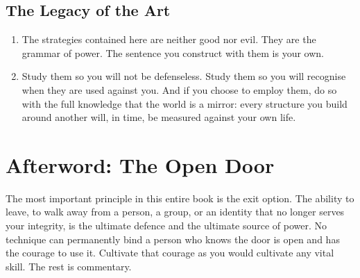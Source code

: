 \documentclass[12pt,a4paper,oneside]{book}
\begin{document}
\section{The Legacy of the Art}
\begin{enumerate}[leftmargin=*, label=\arabic*.]
\item The strategies contained here are neither good nor evil. They are the grammar of power. The sentence you construct with them is your own.
\item Study them so you will not be defenseless. Study them so you will recognise when they are used against you. And if you choose to employ them, do so with the full knowledge that the world is a mirror: every structure you build around another will, in time, be measured against your own life.
\end{enumerate}

\chapter*{Afterword: The Open Door}
The most important principle in this entire book is the exit option. The ability to leave, to walk away from a person, a group, or an identity that no longer serves your integrity, is the ultimate defence and the ultimate source of power. No technique can permanently bind a person who knows the door is open and has the courage to use it. Cultivate that courage as you would cultivate any vital skill. The rest is commentary.
\end{document}
